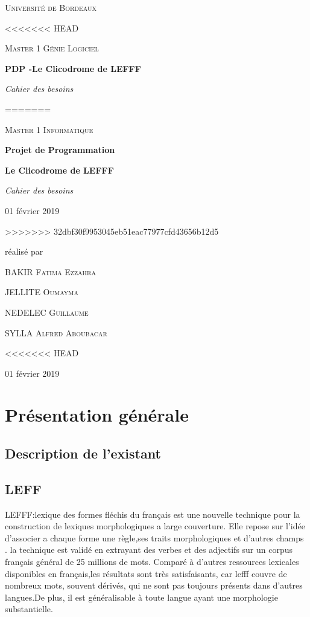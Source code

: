 \documentclass[12pt,a4paper]{article}
\begin{document}
\begin{titlepage}
\centering
{\scshape\LARGE Université de Bordeaux \par}
<<<<<<< HEAD
{\scshape\Large Master 1 Génie Logiciel  \par}
\vspace{3cm}

{\Huge\bfseries PDP -Le Clicodrome de LEFFF \par}
\vspace{0.5cm}
{\Large\itshape Cahier des besoins\par}
=======
{\scshape\Large Master 1 Informatique  \par}
\vspace{3cm}

{\Huge\bfseries Projet de Programmation\par}
{\Huge\bfseries Le Clicodrome de LEFFF \par}
\vspace{0.5cm}
{\Large\itshape Cahier des besoins\par}
{\large 01 février 2019\par}
>>>>>>> 32dbf30f9953045eb51eac77977cfd43656b12d5

\vfill
réalisé par \par
BAKIR \textsc{Fatima Ezzahra} \par
JELLITE \textsc{Oumayma} \par
NEDELEC \textsc{Guillaume} \par
SYLLA  \textsc{Alfred Aboubacar} \par
\vfill

<<<<<<< HEAD
{\large 01 février 2019\par}

\end{titlepage}

\section{Présentation générale }

\subsection{Description de l'existant}

 \subsection*{\textbf{LEFF} }
\smallbreak LEFFF:lexique des formes fléchis du français est une nouvelle technique pour la construction de lexiques morphologiques a large couverture. Elle repose sur l'idée  d'associer a chaque forme une règle,ses traits morphologiques et d'autres champs .
\smallbreak la technique est validé  en extrayant des verbes et des adjectifs sur un corpus français général de 25 millions de mots. Comparé à d'autres ressources lexicales disponibles en français,les résultats sont très satisfaisants, car lefff couvre de nombreux mots, souvent dérivés, qui ne sont pas toujours présents dans d’autres langues.De plus, il est généralisable à toute langue ayant une morphologie substantielle.
\end{document}
